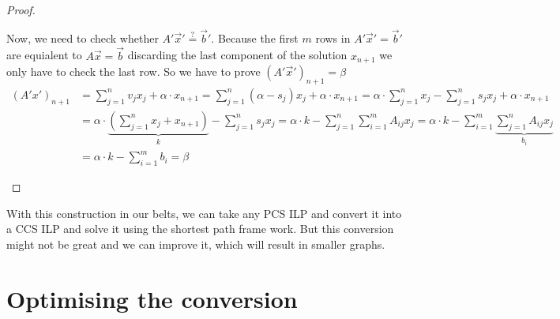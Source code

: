 \begin{proof}
\begin{itemize}
        Now, we need to check whether $A'\vec x'\stackrel{?}{=}\vec b'$. Because the first $m$ rows in $A'\vec x'=\vec b'$ are equialent to $A\vec x=\vec b$ discarding the last component of the solution $x_{n+1}$ we only have to check the last row. So we have to prove $(A'\vec x')_{n+1} = \beta$
        \begin{align*}
            (A'x')_{n+1} &= \sum_{j=1}^{n}v_jx_j + \alpha \cdot x_{n+1} = \sum_{j=1}^{n}(\alpha - s_j)x_j + \alpha \cdot x_{n+1} = \alpha \cdot \sum_{j=1}^{n}x_j - \sum_{j=1}^{n}s_jx_j + \alpha \cdot x_{n+1}\\
            &= \alpha \cdot \underbrace{\left(\sum_{j=1}^{n}x_j + x_{n+1}\right)}_k - \sum_{j=1}^{n}s_jx_j = \alpha \cdot k - \sum_{j=1}^{n}\sum_{i=1}^{m}A_{ij}x_j = \alpha\cdot k - \sum_{i=1}^{m}\underbrace{\sum_{j=1}^{n}A_{ij}x_j}_{b_i}\\
            &= \alpha\cdot k - \sum_{i=1}^{m}b_i = \beta
        \end{align*}
    \end{itemize}
\end{proof}
With this construction in our belts, we can take any PCS ILP and convert it into a CCS ILP and solve it using the shortest path frame work. But this conversion might not be great and we can improve it, which will result in smaller graphs. 

\section{Optimising the conversion}
